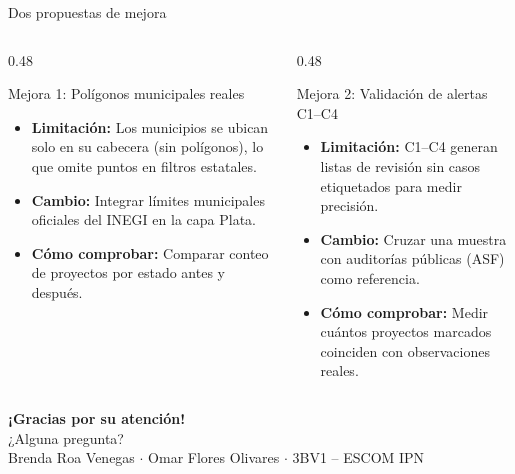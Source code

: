 \documentclass[aspectratio=169,11pt]{beamer}
\begin{document}
\begin{frame}{Dos propuestas de mejora}
  \begin{columns}[T,totalwidth=\textwidth]
    \begin{column}{0.48\textwidth}
      \begin{block}{Mejora 1: Polígonos municipales reales}
        \begin{itemize}
          \item \textbf{Limitación:} Los municipios se ubican solo en su cabecera (sin polígonos), lo que omite puntos en filtros estatales.
          \item \textbf{Cambio:} Integrar límites municipales oficiales del INEGI en la capa Plata.
          \item \textbf{Cómo comprobar:} Comparar conteo de proyectos por estado antes y después.
        \end{itemize}
      \end{block}
    \end{column}

    \begin{column}{0.48\textwidth}
      \begin{exampleblock}{Mejora 2: Validación de alertas C1--C4}
        \begin{itemize}
          \item \textbf{Limitación:} C1--C4 generan listas de revisión sin casos etiquetados para medir precisión.
          \item \textbf{Cambio:} Cruzar una muestra con auditorías públicas (ASF) como referencia.
          \item \textbf{Cómo comprobar:} Medir cuántos proyectos marcados coinciden con observaciones reales.
        \end{itemize}
      \end{exampleblock}
    \end{column}
  \end{columns}
\end{frame}

\begin{frame}[plain]

  \vspace{2.2cm}
  \centering
  {\Huge\color{AzulClaro}\textbf{¡Gracias por su atención!}}\\[0.5cm]
  {\large\color{TextoOscuro} ¿Alguna pregunta?}\\[0.9cm]
  \small\color{GrisSuave}
  Brenda Roa Venegas \quad $\cdot$ \quad Omar Flores Olivares \quad $\cdot$ \quad 3BV1 -- ESCOM IPN
\end{frame}
\end{document}
